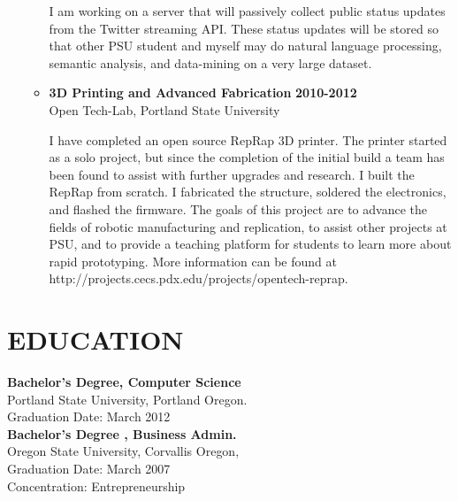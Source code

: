 \documentclass[overlapped]{res}
\begin{document}
\begin{resume}
\begin{itemize}[leftmargin=0in]
\begin{itemize}[leftmargin=0in]
\begin{samepage}
                    I am working on a server that will passively collect public status updates from the
                    Twitter streaming API. These status updates will be stored so that other PSU student
                    and myself may do natural language processing, semantic analysis, and data-mining on
                    a very large dataset.				
                \end{samepage}

            \item[] 
                \begin{samepage}

                    \textbf{3D Printing and Advanced Fabrication} \hfill \textbf{2010-2012} \\
                    Open Tech-Lab, Portland State University

                    I have completed an open source RepRap 3D printer. The printer started as a solo project, 
                    but since the completion of the initial build a team has been found to assist with further 
                    upgrades and research. I built the RepRap from scratch. I fabricated the structure, soldered  
                    the electronics, and flashed the firmware. 	The goals of this project are to advance the 
                    fields of robotic manufacturing and replication, to assist other projects at PSU, and to 
                    provide a teaching platform for students to learn more about rapid prototyping. 
                    More information can be found at http://projects.cecs.pdx.edu/projects/opentech-reprap. 
                \end{samepage}
        \end{itemize}
\end{itemize}
	
\section{EDUCATION} 
\begin{multicols}{2}
    \textbf{Bachelor's Degree, Computer Science} \\
    Portland State University, Portland Oregon. \\
    Graduation Date: March 2012 \\

    \columnbreak
    \textbf{Bachelor's Degree , Business Admin.} \\
    Oregon State University, Corvallis Oregon, \\
    Graduation Date: March 2007 \\
    Concentration: Entrepreneurship
\end{multicols}


\end{resume}
\end{document}
